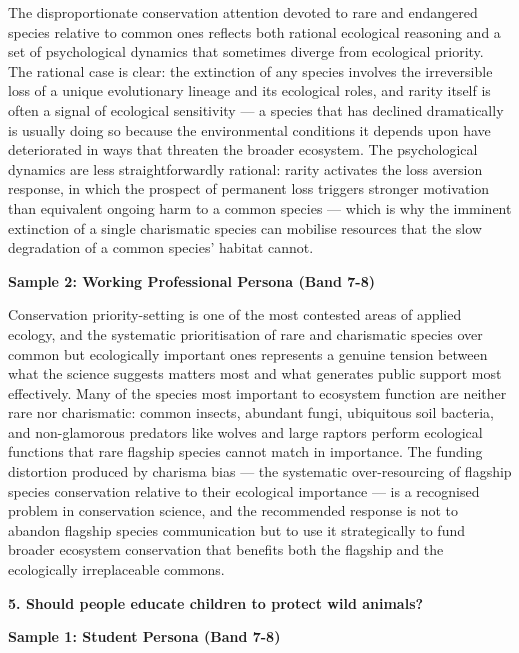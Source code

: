 The disproportionate conservation attention devoted to rare and endangered species relative to common ones reflects both rational ecological reasoning and a set of psychological dynamics that sometimes diverge from ecological priority. The rational case is clear: the extinction of any species involves the irreversible loss of a unique evolutionary lineage and its ecological roles, and rarity itself is often a signal of ecological sensitivity — a species that has declined dramatically is usually doing so because the environmental conditions it depends upon have deteriorated in ways that threaten the broader ecosystem. The psychological dynamics are less straightforwardly rational: rarity activates the loss aversion response, in which the prospect of permanent loss triggers stronger motivation than equivalent ongoing harm to a common species — which is why the imminent extinction of a single charismatic species can mobilise resources that the slow degradation of a common species' habitat cannot.

\textbf{Sample 2: Working Professional Persona (Band 7-8)}

Conservation priority-setting is one of the most contested areas of applied ecology, and the systematic prioritisation of rare and charismatic species over common but ecologically important ones represents a genuine tension between what the science suggests matters most and what generates public support most effectively. Many of the species most important to ecosystem function are neither rare nor charismatic: common insects, abundant fungi, ubiquitous soil bacteria, and non-glamorous predators like wolves and large raptors perform ecological functions that rare flagship species cannot match in importance. The funding distortion produced by charisma bias — the systematic over-resourcing of flagship species conservation relative to their ecological importance — is a recognised problem in conservation science, and the recommended response is not to abandon flagship species communication but to use it strategically to fund broader ecosystem conservation that benefits both the flagship and the ecologically irreplaceable commons.

\separator

\begin{ieltsquestion}
\textbf{5. Should people educate children to protect wild animals?}
\end{ieltsquestion}
\textbf{Sample 1: Student Persona (Band 7-8)}


